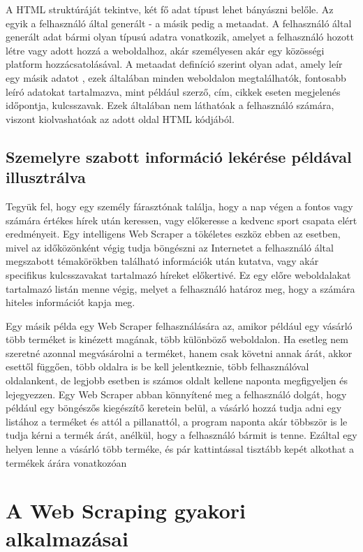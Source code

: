 A HTML struktúráját tekintve, két fő adat típust lehet bányászni belőle. Az egyik a felhasználó által generált - a másik pedig a metaadat. A felhasználó által generált adat bármi olyan típusú adatra vonatkozik, amelyet a felhasználó hozott létre vagy adott hozzá a weboldalhoz, akár személyesen akár egy közösségi platform hozzácsatolásával. A metaadat definíció szerint olyan adat, amely leír egy másik adatot \cite{landers2016primer}, ezek általában minden weboldalon megtalálhatók, fontosabb leíró adatokat tartalmazva, mint például szerző, cím, cikkek eseten megjelenés időpontja, kulcsszavak. Ezek általában nem láthatóak a felhasználó számára, viszont kiolvashatóak az adott oldal HTML kódjából\cite{landers2016primer}.

\subsection{Szemelyre szabott információ lekérése példával illusztrálva}

Tegyük fel, hogy egy személy fárasztónak találja, hogy a nap végen a fontos vagy számára értékes hírek után keressen, vagy előkeresse a kedvenc sport csapata elért eredményeit. Egy intelligens Web Scraper a tökéletes eszköz ebben az esetben, mivel az időközönként végig tudja böngészni az Internetet a felhasználó által megszabott témakörökben található információk után kutatva, vagy akár specifikus kulcsszavakat tartalmazó híreket előkertivé. Ez egy előre weboldalakat tartalmazó listán menne végig, melyet a felhasználó határoz meg, hogy a számára hiteles információt kapja meg\cite{dastidar2016intelligent}.

Egy másik példa egy Web Scraper felhasználására az, amikor például egy vásárló több terméket is kinézett magának, több különböző weboldalon. Ha esetleg nem szeretné azonnal megvásárolni a terméket, hanem csak követni annak árát, akkor esettől függően, több oldalra is be kell jelentkeznie, több felhasználóval oldalankent, de legjobb esetben is számos oldalt kellene naponta megfigyeljen és lejegyezzen. Egy Web Scraper abban könnyítené meg a felhasználó dolgát, hogy például egy böngészős kiegészítő keretein belül, a vásárló hozzá tudja adni egy listához a terméket és attól a pillanattól, a program naponta akár többször is le tudja kérni a termék árát, anélkül, hogy a felhasználó bármit is tenne. Ezáltal egy helyen lenne a vásárló több terméke, és pár kattintással tisztább kepét alkothat a termékek árára vonatkozóan

\section{A Web Scraping gyakori alkalmazásai}

